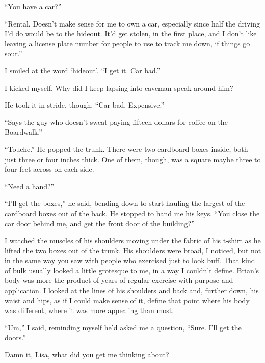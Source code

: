 ``You have a car?''



``Rental.  Doesn't make sense for me to own a car, especially since half the driving I'd do would be to the hideout.  It'd get stolen, in the first place, and I don't like leaving a license plate number for people to use to track me down, if things go sour.''



I smiled at the word `hideout'.  ``I get it.  Car bad.''



I kicked myself.  Why did I keep lapsing into caveman-speak around him?



He took it in stride, though.  ``Car bad.  Expensive.''



``Says the guy who doesn't sweat paying fifteen dollars for coffee on the Boardwalk.''



``Touche.'' He popped the trunk.  There were two cardboard boxes inside, both just three or four inches thick.  One of them, though, was a square maybe three to four feet across on each side.



``Need a hand?''



``I'll get the boxes,'' he said, bending down to start hauling the largest of the cardboard boxes out of the back.  He stopped to hand me his keys.  ``You close the car door behind me, and get the front door of the building?''



I watched the muscles of his shoulders moving under the fabric of his t-shirt as he lifted the two boxes out of the trunk.  His shoulders were broad, I noticed, but not in the same way you saw with people who exercised just to look buff. That kind of bulk usually looked a little grotesque to me, in a way I couldn't define.  Brian's body was more the product of years of regular exercise with purpose and application.  I looked at the lines of his shoulders and back and, further down, his waist and hips, as if I could make sense of it, define that point where his body was different, where it was more appealing than most.



``Um,'' I said, reminding myself he'd asked me a question, ``Sure.  I'll get the doors.''



Damn it, Lisa, what did you get me thinking about?





